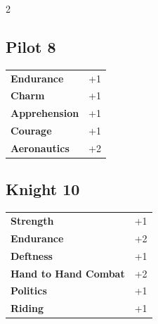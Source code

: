 \begin{multicols}{2}
\begin{tcolorbox}

\end{tcolorbox}

\begin{tcolorbox}
    \subsection*{Pilot \hfill \small{8 }}
    \tcblower




\begin{tabular}{@{}ll@{}}
    \textbf{Endurance} & +1\\
    \textbf{Charm} & +1\\
    \textbf{Apprehension} & +1\\
    \textbf{Courage} & +1\\
    \textbf{Aeronautics} & +2\\
\end{tabular}


\end{tcolorbox}

\begin{tcolorbox}
    \subsection*{Knight \hfill \small{10 }}
    \tcblower




\begin{tabular}{@{}ll@{}}
    \textbf{Strength} & +1\\
    \textbf{Endurance} & +2\\
    \textbf{Deftness} & +1\\
    \textbf{Hand to Hand Combat} & +2\\
    \textbf{Politics} & +1\\
    \textbf{Riding} & +1\\
\end{tabular}


\end{tcolorbox}
\end{multicols}
